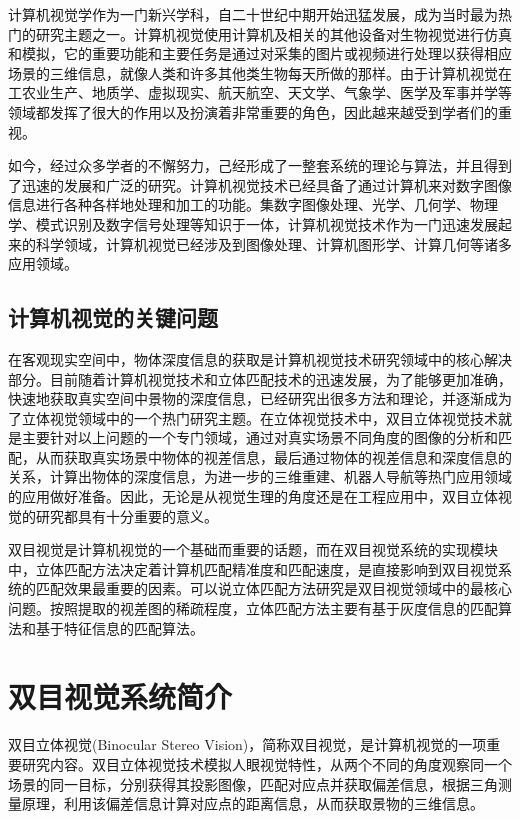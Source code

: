 计算机视觉学作为一门新兴学科，自二十世纪中期开始迅猛发展，成为当时最为热门的研究主题之一。计算机视觉使用计算机及相关的其他设备对生物视觉进行仿真和模拟，它的重要功能和主要任务是通过对采集的图片或视频进行处理以获得相应场景的三维信息，就像人类和许多其他类生物每天所做的那样。由于计算机视觉在工农业生产、地质学、虚拟现实、航天航空、天文学、气象学、医学及军事并学等领域都发挥了很大的作用以及扮演着非常重要的角色，因此越来越受到学者们的重视。

如今，经过众多学者的不懈努力，己经形成了一整套系统的理论与算法，并且得到了迅速的发展和广泛的研究。计算机视觉技术已经具备了通过计算机来对数字图像信息进行各种各样地处理和加工的功能。集数字图像处理、光学、几何学、物理学、模式识别及数字信号处理等知识于一体，计算机视觉技术作为一门迅速发展起来的科学领域，计算机视觉已经涉及到图像处理、计算机图形学、计算几何等诸多应用领域。

\subsection{计算机视觉的关键问题}

在客观现实空间中，物体深度信息的获取是计算机视觉技术研究领域中的核心解决部分。目前随着计算机视觉技术和立体匹配技术的迅速发展，为了能够更加准确，快速地获取真实空间中景物的深度信息，已经研究出很多方法和理论，并逐渐成为了立体视觉领域中的一个热门研究主题。在立体视觉技术中，双目立体视觉技术就是主要针对以上问题的一个专门领域，通过对真实场景不同角度的图像的分析和匹配，从而获取真实场景中物体的视差信息，最后通过物体的视差信息和深度信息的关系，计算出物体的深度信息，为进一步的三维重建、机器人导航等热门应用领域的应用做好准备。因此，无论是从视觉生理的角度还是在工程应用中，双目立体视觉的研究都具有十分重要的意义。 

双目视觉是计算机视觉的一个基础而重要的话题，而在双目视觉系统的实现模块中，立体匹配方法决定着计算机匹配精准度和匹配速度，是直接影响到双目视觉系统的匹配效果最重要的因素。可以说立体匹配方法研究是双目视觉领域中的最核心问题。按照提取的视差图的稀疏程度，立体匹配方法主要有基于灰度信息的匹配算法和基于特征信息的匹配算法。

\section{双目视觉系统简介}

双目立体视觉(Binocular Stereo Vision)，简称双目视觉，是计算机视觉的一项重要研究内容。双目立体视觉技术模拟人眼视觉特性，从两个不同的角度观察同一个场景的同一目标，分别获得其投影图像，匹配对应点并获取偏差信息，根据三角测量原理，利用该偏差信息计算对应点的距离信息，从而获取景物的三维信息。

